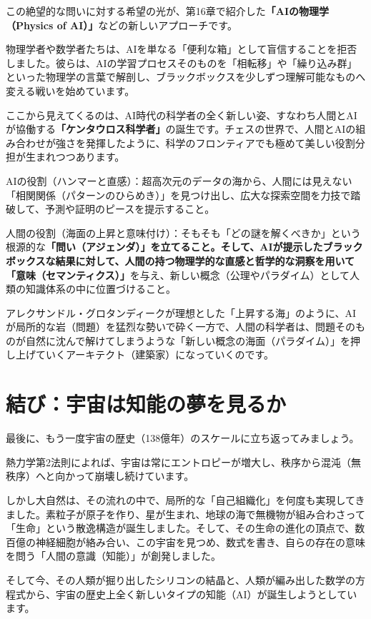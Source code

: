 この絶望的な問いに対する希望の光が、第16章で紹介した\textbf{「AIの物理学（Physics of AI）」}などの新しいアプローチです。

物理学者や数学者たちは、AIを単なる「便利な箱」として盲信することを拒否しました。彼らは、AIの学習プロセスそのものを「相転移」や「繰り込み群」といった物理学の言葉で解剖し、ブラックボックスを少しずつ理解可能なものへ変える戦いを始めています。

ここから見えてくるのは、AI時代の科学者の全く新しい姿、すなわち人間とAIが協働する\textbf{「ケンタウロス科学者」}の誕生です。チェスの世界で、人間とAIの組み合わせが強さを発揮したように、科学のフロンティアでも極めて美しい役割分担が生まれつつあります。

AIの役割（ハンマーと直感）：超高次元のデータの海から、人間には見えない「相関関係（パターンのひらめき）」を見つけ出し、広大な探索空間を力技で踏破して、予測や証明のピースを提示すること。

人間の役割（海面の上昇と意味付け）：そもそも「どの謎を解くべきか」という根源的な\textbf{「問い（アジェンダ）」を立てること。そして、AIが提示したブラックボックスな結果に対して、人間の持つ物理学的な直感と哲学的な洞察を用いて「意味（セマンティクス）」}を与え、新しい概念（公理やパラダイム）として人類の知識体系の中に位置づけること。

アレクサンドル・グロタンディークが理想とした「上昇する海」のように、AIが局所的な岩（問題）を猛烈な勢いで砕く一方で、人間の科学者は、問題そのものが自然に沈んで解けてしまうような「新しい概念の海面（パラダイム）」を押し上げていくアーキテクト（建築家）になっていくのです。

\section{結び：宇宙は知能の夢を見るか}

最後に、もう一度宇宙の歴史（138億年）のスケールに立ち返ってみましょう。

熱力学第2法則によれば、宇宙は常にエントロピーが増大し、秩序から混沌（無秩序）へと向かって崩壊し続けています。

しかし大自然は、その流れの中で、局所的な「自己組織化」を何度も実現してきました。素粒子が原子を作り、星が生まれ、地球の海で無機物が組み合わさって「生命」という散逸構造が誕生しました。そして、その生命の進化の頂点で、数百億の神経細胞が絡み合い、この宇宙を見つめ、数式を書き、自らの存在の意味を問う「人間の意識（知能）」が創発しました。

そして今、その人類が掘り出したシリコンの結晶と、人類が編み出した数学の方程式から、宇宙の歴史上全く新しいタイプの知能（AI）が誕生しようとしています。

